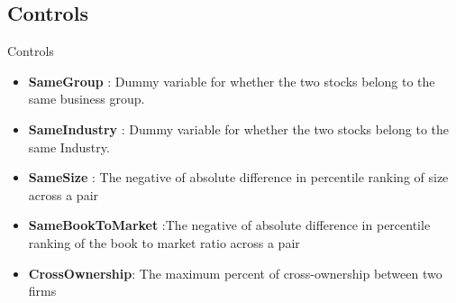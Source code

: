 \documentclass[handout]{beamer}
\begin{document}
	
	\subsection{Controls}
	\begin{frame}{Controls}
		\begin{itemize}
			
			\item \textbf{SameGroup} : Dummy variable for whether the two stocks belong to the same business group.
			
			
			\item \textbf{SameIndustry} : Dummy variable for whether the two stocks belong to the same Industry.
			
			\item \textbf{SameSize} : The negative of absolute difference in percentile ranking of size across a pair
			
			\item \textbf{SameBookToMarket} :The negative of absolute difference in percentile ranking of the book to market ratio across a pair
			
			\item \textbf{CrossOwnership}: The maximum percent of cross-ownership between two firms
		\end{itemize}
	\end{frame}
	
	
	
%				
%			
	
%			
	
	
	
	
%
%		
%				
%		
%		
	
\end{document}
